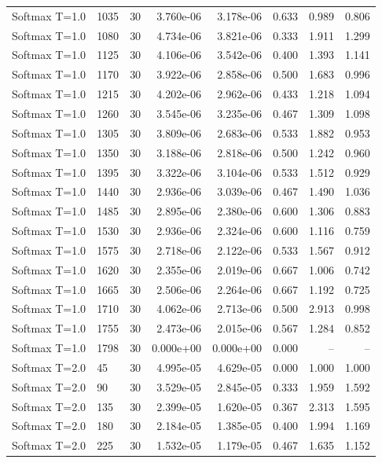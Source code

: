 \begin{scriptsize}
\begin{longtable}{llrrrrrr}
Softmax T=1.0 & 1035 & 30 & 3.760e-06 & 3.178e-06 & 0.633 & 0.989 & 0.806 \\
Softmax T=1.0 & 1080 & 30 & 4.734e-06 & 3.821e-06 & 0.333 & 1.911 & 1.299 \\
Softmax T=1.0 & 1125 & 30 & 4.106e-06 & 3.542e-06 & 0.400 & 1.393 & 1.141 \\
Softmax T=1.0 & 1170 & 30 & 3.922e-06 & 2.858e-06 & 0.500 & 1.683 & 0.996 \\
Softmax T=1.0 & 1215 & 30 & 4.202e-06 & 2.962e-06 & 0.433 & 1.218 & 1.094 \\
Softmax T=1.0 & 1260 & 30 & 3.545e-06 & 3.235e-06 & 0.467 & 1.309 & 1.098 \\
Softmax T=1.0 & 1305 & 30 & 3.809e-06 & 2.683e-06 & 0.533 & 1.882 & 0.953 \\
Softmax T=1.0 & 1350 & 30 & 3.188e-06 & 2.818e-06 & 0.500 & 1.242 & 0.960 \\
Softmax T=1.0 & 1395 & 30 & 3.322e-06 & 3.104e-06 & 0.533 & 1.512 & 0.929 \\
Softmax T=1.0 & 1440 & 30 & 2.936e-06 & 3.039e-06 & 0.467 & 1.490 & 1.036 \\
Softmax T=1.0 & 1485 & 30 & 2.895e-06 & 2.380e-06 & 0.600 & 1.306 & 0.883 \\
Softmax T=1.0 & 1530 & 30 & 2.936e-06 & 2.324e-06 & 0.600 & 1.116 & 0.759 \\
Softmax T=1.0 & 1575 & 30 & 2.718e-06 & 2.122e-06 & 0.533 & 1.567 & 0.912 \\
Softmax T=1.0 & 1620 & 30 & 2.355e-06 & 2.019e-06 & 0.667 & 1.006 & 0.742 \\
Softmax T=1.0 & 1665 & 30 & 2.506e-06 & 2.264e-06 & 0.667 & 1.192 & 0.725 \\
Softmax T=1.0 & 1710 & 30 & 4.062e-06 & 2.713e-06 & 0.500 & 2.913 & 0.998 \\
Softmax T=1.0 & 1755 & 30 & 2.473e-06 & 2.015e-06 & 0.567 & 1.284 & 0.852 \\
Softmax T=1.0 & 1798 & 30 & 0.000e+00 & 0.000e+00 & 0.000 & -- & -- \\
Softmax T=2.0 & 45 & 30 & 4.995e-05 & 4.629e-05 & 0.000 & 1.000 & 1.000 \\
Softmax T=2.0 & 90 & 30 & 3.529e-05 & 2.845e-05 & 0.333 & 1.959 & 1.592 \\
Softmax T=2.0 & 135 & 30 & 2.399e-05 & 1.620e-05 & 0.367 & 2.313 & 1.595 \\
Softmax T=2.0 & 180 & 30 & 2.184e-05 & 1.385e-05 & 0.400 & 1.994 & 1.169 \\
Softmax T=2.0 & 225 & 30 & 1.532e-05 & 1.179e-05 & 0.467 & 1.635 & 1.152 \\

\end{longtable}
\end{scriptsize}
